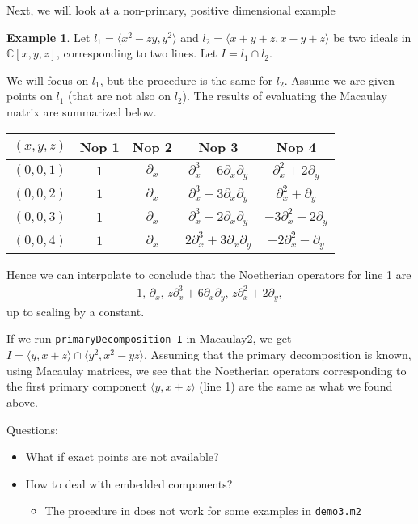 \documentclass[letterpaper]{article}
\theoremstyle{plain}
\theoremstyle{definition}
\newtheorem{example}[theorem]{Example}
\theoremstyle{remark}
\begin{document}
Next, we will look at a non-primary, positive dimensional example
\begin{example}\label{ex:non-primary-numerical-prim-dec}
	Let $l_1 = \langle x^2 - zy, y^2 \rangle$ and $l_2 = \langle x+y+z, x-y+z \rangle$ be two ideals in $\mathbb{C}[x,y,z]$, corresponding to two lines. Let $I = l_1 \cap l_2$.

	We will focus on $l_1$, but the procedure is the same for $l_2$. Assume we are given points on $l_1$ (that are not also on $l_2$). The results of evaluating the Macaulay matrix are summarized below.
	\begin{table}[h!]
	\centering
	\begin{tabular}{ccccc}
	\toprule
	$(x,y,z)$ &  Nop 1 & Nop 2 & Nop 3 & Nop 4\\
	\midrule
	$(0,0,1)$ & $1$ & $\partial_x$ & $\partial_x^3 + 6 \partial_x \partial_y$ & $\partial_x^2 + 2 \partial_y$\\
	$(0,0,2)$ & $1$ & $\partial_x$ & $\partial_x^3 + 3 \partial_x \partial_y$ & $\partial_x^2 + \partial_y$\\
	$(0,0,3)$ & $1$ & $\partial_x$ & $\partial_x^3 + 2 \partial_x \partial_y$ & $-3\partial_x^2 -2 \partial_y$\\
	$(0,0,4)$ & $1$ & $\partial_x$ & $2\partial_x^3 + 3 \partial_x \partial_y$ & $-2\partial_x^2 - \partial_y$\\
	\bottomrule
	\end{tabular}
	\end{table}
	Hence we can interpolate to conclude that the Noetherian operators for line 1 are
	\begin{align*}
		1,\, \partial_x,\,z \partial_x^{3}+6 \partial_x \partial_y,\,z \partial_x^{2}+2 \partial_y,
	\end{align*}
	up to scaling by a constant.

	If we run \texttt{primaryDecomposition I} in Macaulay2, we get $I = \langle y,x+z \rangle \cap \langle y^2, x^2 - yz \rangle$. Assuming that the primary decomposition is known, using Macaulay matrices, we see that the Noetherian operators corresponding to the first primary component $\langle y,x+z \rangle$ (line 1) are the same as what we found above.
\end{example}

Questions:
\begin{itemize}
	\item What if exact points are not available?
	\item How to deal with embedded components?
	\begin{itemize}
		\item The procedure in  does not work for some examples in \texttt{demo3.m2}
	\end{itemize}
\end{itemize}






\nocite*
{}

\end{document}
